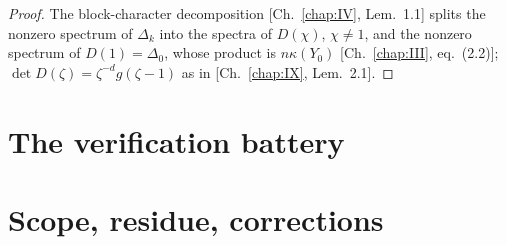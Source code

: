 \begin{proof}
The block-character decomposition [Ch.~\ref{chap:IV}, Lem.~1.1] splits the nonzero spectrum of
$\Delta_k$ into the spectra of $D(\chi)$, $\chi\ne1$, and the nonzero spectrum of
$D(1)=\Delta_0$, whose product is $n\kappa(Y_0)$ [Ch.~\ref{chap:III}, eq.~(2.2)]; $\det D(\zeta)=\zeta^{-d}
g(\zeta-1)$ as in [Ch.~\ref{chap:IX}, Lem.~2.1].
\end{proof}

\section{The verification battery}\label{XIII:sec:battery}

\begin{table}[ht]
\centering\scriptsize
\renewcommand{\arraystretch}{1.2}
\medskip
\caption{Verification (\texttt{cohn\_localization.py}) on the $K_4$ Iwahori tower and the
$(1,1,1)$ abelian tower.}
\label{XIII:tab:battery}
\end{table}

\section{Scope, residue, corrections}\label{XIII:sec:scope}

